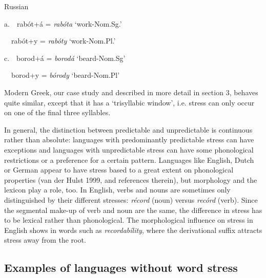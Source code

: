 \documentclass[a4paper]{article}
\begin{document}
\ea Russian

{
a.\ \ rabót+á = \textit{rabóta }‘work-Nom.Sg.’}

{
\ \ rabót+y = \textit{rabóty} ‘work-Nom.Pl.’}

{
c.\ \ borod+á = \textit{borodá} ‘beard-Nom.Sg’}

{
\ \ borod+y = \textit{bórody} ‘beard-Nom.Pl’}
\z

Modern Greek, our case study and described in more detail in section 3, behaves quite similar, except that it has a ‘trisyllabic window’, i.e. stress can only occur on one of the final three syllables.

In general, the distinction between predictable and unpredictable is continuous rather than absolute: languages with predominantly predictable stress can have exceptions and languages with unpredictable stress can have some phonological restrictions or a preference for a certain pattern. Languages like English, Dutch or German appear to have stress based to a great extent on phonological properties (van der Hulst 1999, and references therein), but morphology and the lexicon play a role, too. In English, verbs and nouns are sometimes only distinguished by their different stresses: \textit{récord} (noun) versus \textit{recórd} (verb). Since the segmental make-up of verb and noun are the same, the difference in stress has to be lexical rather than phonological. The morphological influence on stress in English shows in words such as \textit{recordabílity}, where the derivational suffix attracts stress away from the root.

\subsection{
Examples of languages without word stress}
\end{document}
